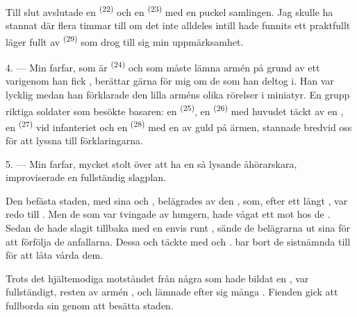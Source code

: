 Till slut avslutade en  \textsuperscript{(22)} och en
 \textsuperscript{(23)} med en puckel samlingen. Jag skulle ha
stannat där flera timmar till om det inte alldeles intill hade funnits ett praktfullt läger
fullt av  \textsuperscript{(29)} som drog till sig min uppmärksamhet.

\VUsaut{4.0mm}
\VUsaut{2.8mm}

4. --- Min farfar, som är  \textsuperscript{(24)} och som måste lämna armén på
grund av ett  varigenom han fick
, berättar gärna för mig om de  som han
deltog i. Han var lycklig medan han förklarade den lilla arméns olika rörelser i miniatyr. En
grupp riktiga soldater som besökte basaren: en 
\textsuperscript{(25)}, en  \textsuperscript{(26)} med huvudet täckt av en
, en  \textsuperscript{(27)} vid infanteriet och en
 \textsuperscript{(28)} med en  av guld på
ärmen, stannade bredvid oss för att lyssna till förklaringarna.

5. --- Min farfar, mycket stolt över att ha en så lysande åhörarskara, improviserade en
fullständig slagplan.

Den befästa staden, med sina  och , belägrades av den
, som, efter ett långt , var redo till
. Men de  som var tvingade av hungern, hade vågat ett
 mot  hos de
. Sedan de hade slagit tillbaka  med en
envis  runt , sände de  belägrarna ut sina
 för att förfölja de  anfallarna. Dessa
 och täckte  med
 och .  bar bort de sistnämnda
till  för att låta  vårda dem.

Trots det hjältemodiga motståndet från några  som hade bildat en
, var  fullständigt, resten av armén
, och lämnade efter sig många . Fienden gick att
fullborda sin  genom att besätta staden.

